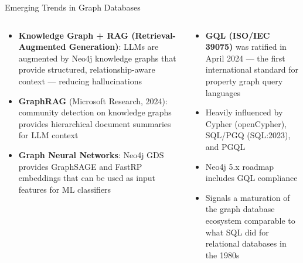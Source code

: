 \documentclass[aspectratio=169]{beamer}
\begin{document}
\begin{frame}{Emerging Trends in Graph Databases}
  \begin{columns}[T]
      \begin{tcolorbox}[neo4jbox, title=Graph + AI / LLMs]
        \small
        \begin{itemize}
          \item \textbf{Knowledge Graph + RAG (Retrieval-Augmented Generation)}: LLMs are augmented by Neo4j knowledge graphs that provide structured, relationship-aware context — reducing hallucinations
          \item \textbf{GraphRAG} (Microsoft Research, 2024): community detection on knowledge graphs provides hierarchical document summaries for LLM context
          \item \textbf{Graph Neural Networks}: Neo4j GDS provides GraphSAGE and FastRP embeddings that can be used as input features for ML classifiers
        \end{itemize}
      \end{tcolorbox}
      \begin{tcolorbox}[neo4jbox, title=GQL: The ISO Graph Query Standard]
        \small
        \begin{itemize}
          \item \textbf{GQL (ISO/IEC 39075)} was ratified in April 2024 — the first international standard for property graph query languages
          \item Heavily influenced by Cypher (openCypher), SQL/PGQ (SQL:2023), and PGQL
          \item Neo4j 5.x roadmap includes GQL compliance
          \item Signals a maturation of the graph database ecosystem comparable to what SQL did for relational databases in the 1980s
        \end{itemize}
      \end{tcolorbox}
  \end{columns}
\end{frame}
\end{document}
